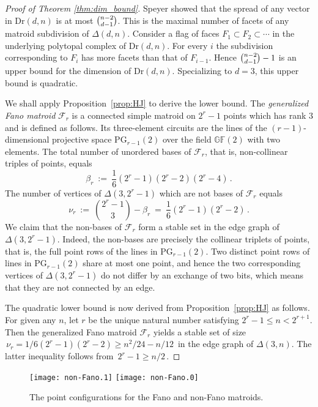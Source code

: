 \documentclass[12pt,a4paper]{amsart}
\theoremstyle{definition}
\newcommand{\PG}{{\mathrm{PG}}}
\newcommand{\Dr}{{\mathrm{Dr}}}
\providecommand\cF{{\mathscr{F}}}
\providecommand{\GF}{{\mathbb{GF}}}
\begin{document}
\begin{proof}[Proof of Theorem \ref{thm:dim_bound}]
  Speyer \cite[Theorem~6.1]{Spe1} showed that the spread of any vector
  in $\Dr(d,n)$ is at most $\tbinom{n-2}{d-1}$.  This is the maximal
  number of facets of any matroid subdivision of $\Delta(d,n)$.
  Consider a flag of faces $F_1\subset F_2\subset\cdots$ in the
  underlying polytopal complex of $\Dr(d,n)$.  For every $i$ the
  subdivision corresponding to $F_i$ has more facets than that of
  $F_{i-1}$.  Hence $\tbinom{n-2}{d-1}-1$ is an upper bound for the
  dimension of $\Dr(d,n)$.  Specializing to $d=3$, this upper bound is
  quadratic.

  We shall apply Proposition~\ref{prop:HJ} to derive the lower bound.  The
  \emph{generalized Fano matroid} $\cF_r$ is a connected simple matroid on
  $2^r-1$ points which has rank $3$ and is defined as follows.  Its
  three-element circuits are the lines of the $(r-1)$-dimensional projective
  space $\PG_{r-1}(2)$ over the field $\GF(2)$ with two elements.  The total
  number of unordered bases of $\cF_r$, that is, non-collinear triples of
  points, equals
  \[
  \beta_r \ := \ \frac{1}{6}(2^r-1)(2^{r}-2)(2^r-4) \, .
  \]
  The number of vertices of $\Delta(3,2^r-1)$ which are not bases of
  $\cF_r$ equals
  \[
  \nu_r \ := \ \binom{2^r-1}{3}-\beta_r \ = \
  \frac{1}{6}(2^r-1)(2^r-2) \, .
  \]
  We claim that the non-bases of $\cF_r$ form a stable set in the edge
  graph of $\Delta(3,2^r-1)$. Indeed, the non-bases are precisely the
  collinear triplets of points, that is, the full point rows of the
  lines in $\PG_{r-1}(2)$.  Two distinct point rows of lines in
  $\PG_{r-1}(2)$ share at most one point, and hence the two
  corresponding vertices of $\Delta(3,2^r-1)$ do not differ by an
  exchange of two bits, which means that they are not connected by an
  edge.

  The quadratic lower bound is now derived from
  Proposition~\ref{prop:HJ} as follows. For given any $n$, let $r$ be the
  unique natural number satisfying $2^r-1 \le n < 2^{r+1}$.  Then the
  generalized Fano matroid $\cF_r$ yields a stable set of size
  $\,\nu_r={1}/{6}(2^r-1)(2^r-2)\ge n^2/24-n/12\,$ in the edge graph
  of $\Delta(3,n)$.  The latter inequality follows from $\,2^r-1\ge
  n/2\,$.
\end{proof}

\begin{figure}[htb]\centering
  \texttt{[image: non-Fano.1]}
  \hskip 2cm
  \texttt{[image: non-Fano.0]}
  \caption{The point configurations for the Fano and
    non-Fano matroids.}
  \label{fig:non-fano}
\end{figure}
\end{document}
